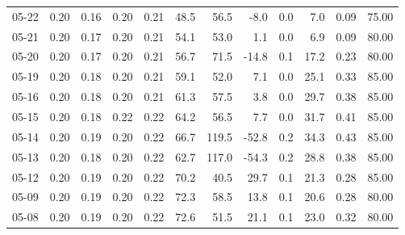 \begin{threeparttable}
{\begin{tabular}{lrrrrrrrrrrr}
  05-22 &          0.20 &          0.16 &          0.20 &        0.21 &                48.5 &                56.5 &       -8.0 &                 0.0 &              7.0 &            0.09 &                  75.00 \\
  05-21 &          0.20 &          0.17 &          0.20 &        0.21 &                54.1 &                53.0 &        1.1 &                 0.0 &              6.9 &            0.09 &                  80.00 \\
  05-20 &          0.20 &          0.17 &          0.20 &        0.21 &                56.7 &                71.5 &      -14.8 &                 0.1 &             17.2 &            0.23 &                  80.00 \\
  05-19 &          0.20 &          0.18 &          0.20 &        0.21 &                59.1 &                52.0 &        7.1 &                 0.0 &             25.1 &            0.33 &                  85.00 \\
  05-16 &          0.20 &          0.18 &          0.20 &        0.21 &                61.3 &                57.5 &        3.8 &                 0.0 &             29.7 &            0.38 &                  85.00 \\
  05-15 &          0.20 &          0.18 &          0.22 &        0.22 &                64.2 &                56.5 &        7.7 &                 0.0 &             31.7 &            0.41 &                  85.00 \\
  05-14 &          0.20 &          0.19 &          0.20 &        0.22 &                66.7 &               119.5 &      -52.8 &                 0.2 &             34.3 &            0.43 &                  85.00 \\
  05-13 &          0.20 &          0.18 &          0.20 &        0.22 &                62.7 &               117.0 &      -54.3 &                 0.2 &             28.8 &            0.38 &                  85.00 \\
  05-12 &          0.20 &          0.19 &          0.20 &        0.22 &                70.2 &                40.5 &       29.7 &                 0.1 &             21.3 &            0.28 &                  85.00 \\
  05-09 &          0.20 &          0.19 &          0.20 &        0.22 &                72.3 &                58.5 &       13.8 &                 0.1 &             20.6 &            0.28 &                  80.00 \\
  05-08 &          0.20 &          0.19 &          0.20 &        0.22 &                72.6 &                51.5 &       21.1 &                 0.1 &             23.0 &            0.32 &                  80.00 \\

\end{tabular}}
\end{threeparttable}
